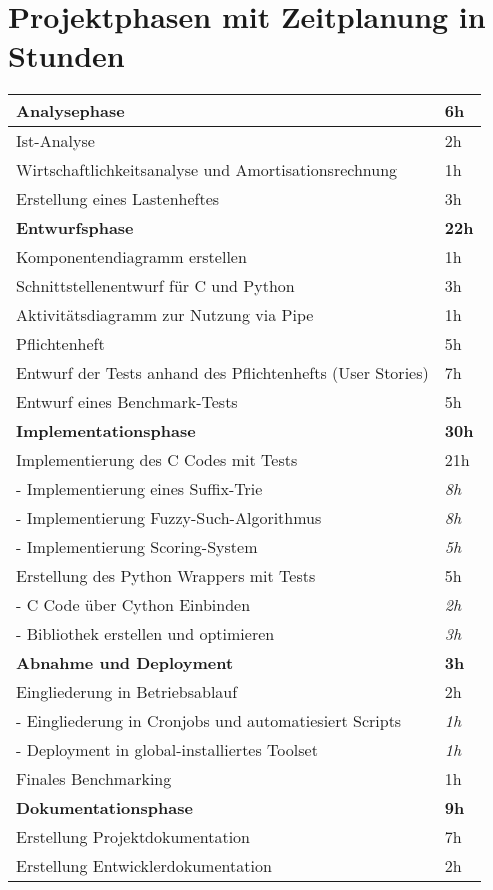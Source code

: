 \documentclass[fontsize=12pt,paper=a4,draft=off,titlepage=off]{scrartcl}
\begin{document}
\section{Projektphasen mit Zeitplanung in Stunden}
\begin{table}[!htp]
    \centering
    \label{Übersicht Phasendauer}
    \begin{tabular}{ll}
        \textbf{Analysephase} & \textbf{6h} \\
        \hline
            Ist-Analyse & 2h \\
            Wirtschaftlichkeitsanalyse und Amortisationsrechnung & 1h \\
            Erstellung eines Lastenheftes & 3h \\

        \textbf{Entwurfsphase} & \textbf{22h} \\
        \hline
            Komponentendiagramm erstellen & 1h \\
            Schnittstellenentwurf für C und Python & 3h \\
            Aktivitätsdiagramm zur Nutzung via Pipe & 1h \\
            Pflichtenheft & 5h \\
            Entwurf der Tests anhand des Pflichtenhefts (User Stories) & 7h \\
            Entwurf eines Benchmark-Tests & 5h \\

        \textbf{Implementationsphase} & \textbf{30h} \\
        \hline
            Implementierung des C Codes mit Tests & 21h \\
            - Implementierung eines Suffix-Trie & \textit{8h} \\
            - Implementierung Fuzzy-Such-Algorithmus & \textit{8h} \\
            - Implementierung Scoring-System & \textit{5h} \\
            Erstellung des Python Wrappers mit Tests & 5h \\
            - C Code über Cython Einbinden & \textit{2h} \\
            - Bibliothek erstellen und optimieren & \textit{3h} \\

        \textbf{Abnahme und Deployment} & \textbf{3h} \\
        \hline
            Eingliederung in Betriebsablauf & 2h \\
            - Eingliederung in Cronjobs und automatiesiert Scripts & \textit{1h} \\
            - Deployment in global-installiertes Toolset & \textit{1h} \\
            Finales Benchmarking & 1h \\

        \textbf{Dokumentationsphase} & \textbf{9h} \\
        \hline
            Erstellung Projektdokumentation & 7h \\
            Erstellung Entwicklerdokumentation & 2h \\
    \end{tabular}
\end{table}
\end{document}
